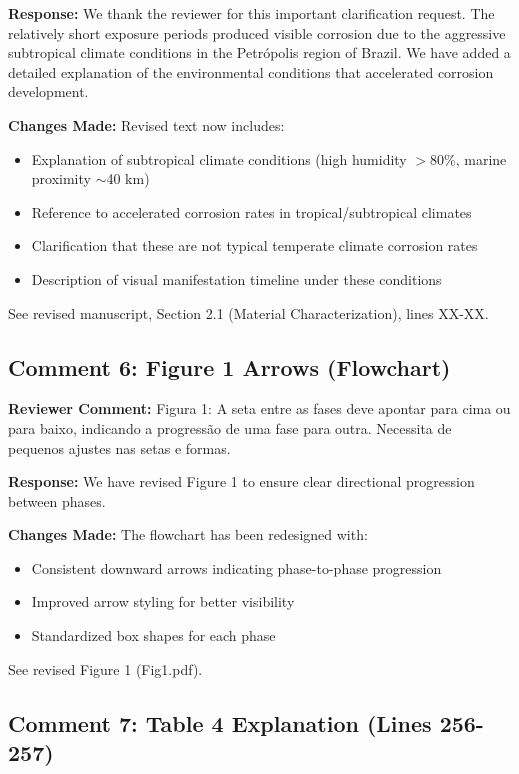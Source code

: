 \documentclass[11pt]{article}
\newcommand{\reviewercomment}[1]{\textcolor{reviewercolor}{\textbf{Reviewer Comment:} #1}}
\newcommand{\response}[1]{\textcolor{responsecolor}{\textbf{Response:} #1}}
\newcommand{\change}[1]{\textcolor{changecolor}{\textbf{Changes Made:} #1}}
\begin{document}
\response{We thank the reviewer for this important clarification request. The relatively short exposure periods produced visible corrosion due to the aggressive subtropical climate conditions in the Petrópolis region of Brazil. We have added a detailed explanation of the environmental conditions that accelerated corrosion development.}

\change{Revised text now includes:
\begin{itemize}[nosep]
    \item Explanation of subtropical climate conditions (high humidity $>$80\%, marine proximity $\sim$40 km)
    \item Reference to accelerated corrosion rates in tropical/subtropical climates
    \item Clarification that these are not typical temperate climate corrosion rates
    \item Description of visual manifestation timeline under these conditions
\end{itemize}

See revised manuscript, Section 2.1 (Material Characterization), lines XX-XX.}

\subsection{Comment 6: Figure 1 Arrows (Flowchart)}

\reviewercomment{Figura 1: A seta entre as fases deve apontar para cima ou para baixo, indicando a progressão de uma fase para outra. Necessita de pequenos ajustes nas setas e formas.}

\response{We have revised Figure 1 to ensure clear directional progression between phases.}

\change{The flowchart has been redesigned with:
\begin{itemize}[nosep]
    \item Consistent downward arrows indicating phase-to-phase progression
    \item Improved arrow styling for better visibility
    \item Standardized box shapes for each phase
\end{itemize}

See revised Figure 1 (Fig1.pdf).}

\subsection{Comment 7: Table 4 Explanation (Lines 256-257)}
\end{document}
